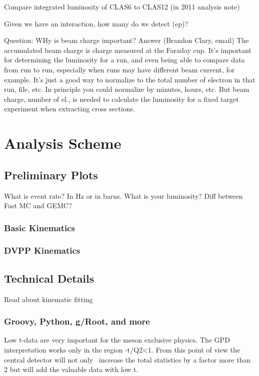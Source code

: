     Compare integrated luminosity of CLAS6 to CLAS12 (in 2011 analysis note)
    
    
    Given we have an interaction, how many do we detect (ep)?
    
    Question: WHy is beam charge important?
    Answer (Brandon Clary, email) The accumulated beam charge is charge measured at the Faraday cup. It's important for determining the luminosity for a run, and even being able to compare data from run to run, especially when runs may have different beam current, for example. It's just a good way to normalize to the total number of electron in that run, file, etc. In principle you could normalize by minutes, hours, etc. But beam charge, number of el., is needed to calculate the luminosity for a fixed target experiment when extracting cross sections.
\chapter{Analysis Scheme}
    \section{Preliminary Plots}
    What is event rate? In Hz or in barns. What is your luminosity?
    Diff between Fast MC and GEMC?
        \subsection{Basic Kinematics}
        \subsection{DVPP Kinematics}

    \section{Technical Details}
        Read about kinematic fitting
            \subsection{Groovy, Python, g/Root, and more}
            
            
            


Low t-data are very important for the meson exclusive physics. The GPD interpretation works only in the region -t/Q2<1. From this point of view the central detector will not only  increase the total statistics by a factor more than 2 but will add the valuable data with low t.


